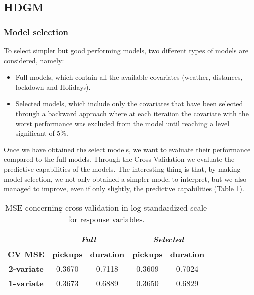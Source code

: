 \subsection{HDGM}
\subsubsection{Model selection} To select simpler but good performing models, two different types of models are considered, namely:
\begin{itemize}
	\item Full models, which contain all the available covariates (weather, distances, lockdown and Holidays).
	\item Selected models, which include only the covariates that have been selected through a backward approach where at each iteration the covariate with the worst performance was excluded from the model until reaching a level significant of \num{5}\%.
\end{itemize}
Once we have obtained the select models, we want to evaluate their performance compared to the full models. Through the Cross Validation we evaluate the predictive capabilities of the models. The interesting thing is that, by making model selection, we not only obtained a simpler model to interpret, but we also managed to improve, even if only slightly, the predictive capabilities (Table \ref{Cross-validation mean squared errors HDGM}).
 
\begin{table}[h!]
	\centering
	\renewcommand\arraystretch{1.3}
	\begin{tabular}{c|cc|cc}
		\hline
		\multicolumn{1}{l|}{} & \multicolumn{2}{c|}{\textit{Full}} & \multicolumn{2}{c}{\textit{Selected} }\\ 
		\hline
		\textbf{CV MSE} & \multicolumn{1}{c|}{\textbf{pickups }} & \textbf{duration} & \multicolumn{1}{c|}{\textbf{pickups}} & \textbf{duration} \\ 
		\hline
		\textbf{2-variate } & \multicolumn{1}{c|}{0.3670}  & 0.7118   & \multicolumn{1}{c|}{0.3609}  & 0.7024   \\ 
		\hline
		\textbf{1-variate } & \multicolumn{1}{c|}{0.3673}  & 0.6889   & \multicolumn{1}{c|}{0.3650}  & 0.6829   \\ 
		\hline
	\end{tabular}
	\caption[MSE concerning cross-validation in log-standardized scale for response variables (HDGM)]{MSE concerning cross-validation in log-standardized scale for response variables.}
	\label{Cross-validation mean squared errors HDGM}
\end{table}

